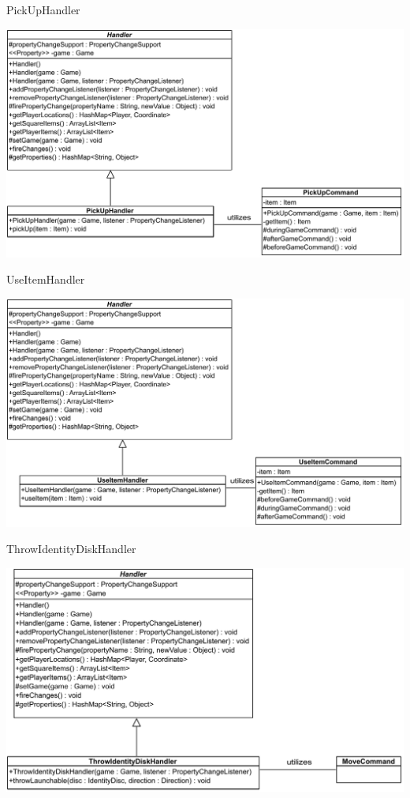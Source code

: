 \documentclass[11pt,t]{beamer}
\begin{document}
\begin{frame}{PickUpHandler}
\begin{center}
\includegraphics[scale=0.45]{images/pickuphandler}
\end{center}
\end{frame}

\begin{frame}{UseItemHandler}
\begin{center}
\includegraphics[scale=0.45]{images/useitemhandler}
\end{center}
\end{frame}

\begin{frame}{ThrowIdentityDiskHandler}
\begin{center}
\includegraphics[scale=0.45]{images/throwIdentityDischandler}
\end{center}
\end{frame}
\end{document}
